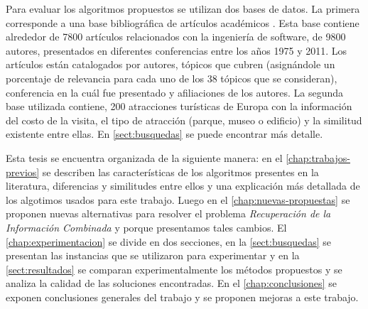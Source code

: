 Para evaluar los algoritmos propuestos se utilizan dos bases de datos. La primera corresponde a una base bibliográfica de artículos académicos \cite{dataDrive}. Esta base contiene alrededor de 7800 artículos relacionados con la ingeniería de software, de 9800 autores, presentados en diferentes conferencias entre los años 1975 y 2011. Los artículos están catalogados por autores, tópicos que cubren (asignándole un porcentaje de relevancia para cada uno de los 38 tópicos que se consideran), conferencia en la cuál fue presentado y afiliaciones de los autores. La segunda base utilizada contiene, 200 atracciones turísticas de Europa con la información del costo de la visita, el tipo de atracción (parque, museo o edificio) y la similitud existente entre ellas. En \autoref{sect:busquedas} se puede encontrar más detalle.

Esta tesis se encuentra organizada de la siguiente manera: en el \autoref{chap:trabajos-previos} se describen las características de los algoritmos presentes en la literatura, diferencias y similitudes entre ellos y una explicación más detallada de los algotimos usados para este trabajo. Luego en el \autoref{chap:nuevas-propuestas} se proponen nuevas alternativas para resolver el problema {\em Recuperación de la Información Combinada} y porque presentamos tales cambios. El \autoref{chap:experimentacion} se divide en dos secciones, en la \autoref{sect:busquedas} se presentan las instancias que se utilizaron para experimentar y en la \autoref{sect:resultados} se 
comparan experimentalmente los métodos propuestos y se analiza la calidad de las soluciones encontradas. En el \autoref{chap:conclusiones} se exponen conclusiones generales del trabajo y se proponen mejoras a este trabajo.
